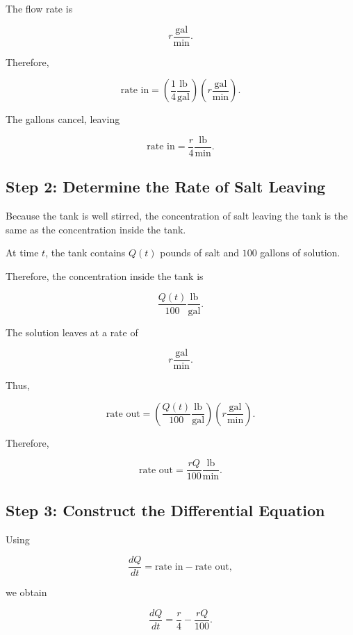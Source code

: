 \documentclass[11pt]{article}
\begin{document}
The flow rate is

\[
r\frac{\text{gal}}{\text{min}}.
\]

Therefore,

\[
\text{rate in}
=
\left(
\frac14\frac{\text{lb}}{\text{gal}}
\right)
\left(
r\frac{\text{gal}}{\text{min}}
\right).
\]

The gallons cancel, leaving

\[
\boxed{
\text{rate in}=\frac{r}{4}\frac{\text{lb}}{\text{min}}.
}
\]

\subsection{Step 2: Determine the Rate of Salt Leaving}

Because the tank is well stirred, the concentration of salt leaving
the tank is the same as the concentration inside the tank.

At time \(t\), the tank contains \(Q(t)\) pounds of salt and
\(100\) gallons of solution.

Therefore, the concentration inside the tank is

\[
\boxed{
\frac{Q(t)}{100}
\frac{\text{lb}}{\text{gal}}.
}
\]

The solution leaves at a rate of

\[
r\frac{\text{gal}}{\text{min}}.
\]

Thus,

\[
\text{rate out}
=
\left(
\frac{Q(t)}{100}
\frac{\text{lb}}{\text{gal}}
\right)
\left(
r\frac{\text{gal}}{\text{min}}
\right).
\]

Therefore,

\[
\boxed{
\text{rate out}
=
\frac{rQ}{100}
\frac{\text{lb}}{\text{min}}.
}
\]

\subsection{Step 3: Construct the Differential Equation}

Using

\[
\frac{dQ}{dt}
=
\text{rate in}-\text{rate out},
\]

we obtain

\[
\frac{dQ}{dt}
=
\frac{r}{4}
-
\frac{rQ}{100}.
\]
\end{document}
